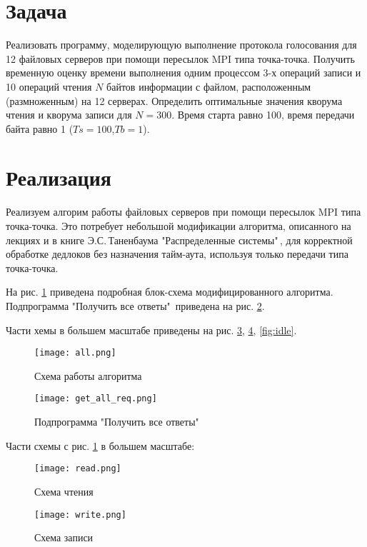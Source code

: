 \section*{Задача}
Реализовать программу, моделирующую выполнение протокола голосования для
12 файловых серверов при помощи пересылок MPI типа точка-точка. Получить
временную оценку времени выполнения одним процессом 3-х операций записи и
10 операций чтения $N$ байтов информации с файлом, расположенным (размноженным)
на 12 серверах. Определить оптимальные значения кворума чтения и кворума записи
для $N=300$. Время старта равно 100, время передачи байта равно 1
($Ts=100$,$Tb=1$).


\section*{Реализация}

Реализуем алгорим работы файловых серверов при помощи пересылок MPI типа
точка-точка. Это потребует небольшой модификации алгоритма, описанного на
лекциях и в книге Э.С.\,Таненбаума "Распределенные системы"\,, для корректной
обработке дедлоков без назначения тайм-аута, используя только передачи типа
точка-точка.

На рис. \ref{fig:all} приведена подробная блок-схема модифицированного
алгоритма. Подпрограмма "Получить все ответы"\, приведена на рис.
\ref{fig:get_all_req}.

Части хемы в большем масштабе приведены на рис. \ref{fig:read},
\ref{fig:write}, \ref{fig:idle}.

\begin{figure}[H]
    \centering
    \texttt{[image: all.png]}
    \caption{Схема работы алгоритма}
    \label{fig:all}
\end{figure}

\begin{figure}[H]
    \centering
    \texttt{[image: get\_all\_req.png]}
    \caption{Подпрограмма "Получить все ответы"\,}
    \label{fig:get_all_req}
\end{figure}

Части схемы с рис. \ref{fig:all} в большем масштабе:

\begin{figure}[H]
    \centering
    \texttt{[image: read.png]}
    \caption{Схема чтения}
    \label{fig:read}
\end{figure}

\begin{figure}[H]
    \centering
    \texttt{[image: write.png]}
    \caption{Схема записи}
    \label{fig:write}
\end{figure}

